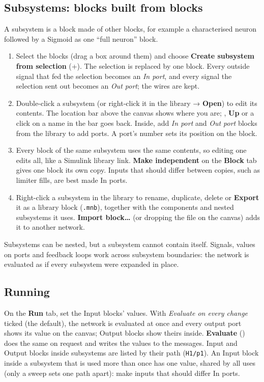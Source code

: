 \documentclass[11pt,a4paper]{article}
\newcommand{\code}[1]{\texttt{#1}}
\newcommand{\menu}[1]{\textsf{\textbf{#1}}}
\newcommand{\key}[1]{\fbox{\footnotesize\textsf{#1}}}
\begin{document}
\subsection*{Subsystems: blocks built from blocks}
A subsystem is a block made of other blocks, for example a characterised neuron followed by a Sigmoid as one
``full neuron'' block.
\begin{enumerate}
\item Select the blocks (drag a box around them) and choose \menu{Create subsystem from selection}
  (\key{Ctrl}+\key{G}). The selection is replaced by one block. Every outside signal that fed the selection becomes an
  \emph{In port}, and every signal the selection sent out becomes an \emph{Out port}; the wires are kept.
\item Double-click a subsystem (or right-click it in the library → \menu{Open}) to edit its contents. The location
  bar above the canvas shows where you are; \key{Backspace}, \menu{Up} or a click on a name in the bar goes back.
  Inside, add \emph{In port} and \emph{Out port} blocks from the library to add ports. A port's number sets its
  position on the block.
\item Every block of the same subsystem uses the same contents, so editing one edits all, like a Simulink library
  link. \menu{Make independent} on the \menu{Block} tab gives one block its own copy. Inputs that should differ
  between copies, such as limiter fills, are best made In ports.
\item Right-click a subsystem in the library to rename, duplicate, delete or \menu{Export} it as a library block
  (\code{.mnb}), together with the components and nested subsystems it uses. \menu{Import block…} (or dropping the
  file on the canvas) adds it to another network.
\end{enumerate}
Subsystems can be nested, but a subsystem cannot contain itself. Signals, values on ports and feedback loops work
across subsystem boundaries: the network is evaluated as if every subsystem were expanded in place.

\subsection*{Running}
On the \menu{Run} tab, set the Input blocks' values. With \emph{Evaluate on every change} ticked (the default), the
network is evaluated at once and every output port shows its value on the canvas; Output blocks show theirs inside.
\menu{Evaluate} (\key{F5}) does the same on request and writes the values to the messages. Input and Output blocks
inside subsystems are listed by their path (\code{H1/p1}). An Input block inside a subsystem that is used more than
once has one value, shared by all uses (only a sweep sets one path apart): make inputs that should differ In ports.
\end{document}
